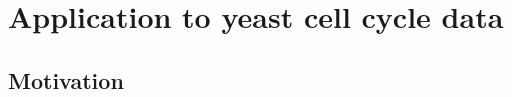 \documentclass[12pt]{article}
\begin{document}



\section{Application to yeast cell cycle data}
\label{sec:application-yeast}

\subsection{Motivation}
\end{document}
